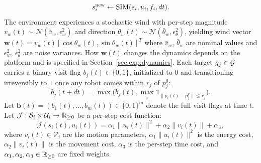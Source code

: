 \documentclass{article}
\begin{document}
\begin{equation}
    s_i^{\mathrm{new}} \gets \operatorname{SIM}(s_i, u_i, f_i, dt). \label{eq:simulate}
\end{equation}
The environment experiences a stochastic wind with per-step magnitude $v_w(t) \sim \mathcal{N}(\bar{v}_w, \epsilon_w^2)$ and direction $\theta_w(t) \sim \mathcal{N}(\bar{\theta}_w, \epsilon_\theta^2)$, yielding wind vector $\mathbf{w}(t) = v_w(t) [\cos\theta_w(t),  \sin\theta_w(t)]^T$ where $\bar{v}_w$, $\bar{\theta}_w$ are nominal values and $\epsilon_w^2$, $\epsilon_\theta^2$ are noise variances. How $\mathbf{w}(t)$ changes the dynamics depends on the platform and is specified in Section~\ref{sec:exp:dynamics}. Each target $g_j \in \mathcal{G}$ carries a binary visit flag $b_j(t) \in \{0, 1\}$, initialized to $0$ and transitioning irreversibly to $1$ once any robot comes within $r_j$ of $p_j^g$:
\begin{equation}
    b_j(t+dt) = \max \Big( b_j(t),  \max_{i} \mathds{1}_{\|p_i(t) - p_j^g\| \leq r_j} \Big). \label{eq:coverage}
\end{equation}
Let $\mathbf{b}(t) = (b_1(t), \ldots, b_m(t)) \in \{0,1\}^m$ denote the full visit flags at time $t$. Let $\mathcal{J} : \mathcal{S}_i \times \mathcal{U}_i \to \mathbb{R}_{\geq 0}$ be a per-step cost function:
\begin{equation}
    \mathcal{J}(s_i(t), u_i(t)) = \alpha_1 \|u_i(t)\|^2 + \alpha_2 \|v_i(t)\| + \alpha_3, \label{eq:cost}
\end{equation}
where $v_i(t) \in \mathcal{V}_i$ are the motion parameters, $\alpha_1 \|u_i(t)\|^2$ is the energy cost, $\alpha_2 \|v_i(t)\|$ is the movement cost, $\alpha_3$ is the per-step time cost, and $\alpha_1, \alpha_2, \alpha_3 \in \mathbb{R}_{\geq 0}$ are fixed weights. 
\end{document}

